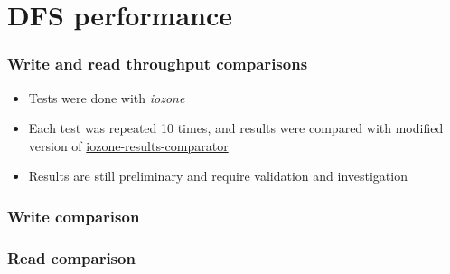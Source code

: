 \documentclass[handout]{beamer}
\begin{document}
\section{DFS performance}
\begin{frame}
\frametitle{Write and read throughput comparisons}
\begin{itemize}
\item Tests were done with \emph{iozone}
\item Each test was repeated 10 times, and results were compared with modified version of \href{https://code.google.com/p/iozone-results-comparator/}{iozone-results-comparator}
\item Results are still preliminary and require validation and investigation
\end{itemize}
\end{frame}
\begin{frame}
\frametitle{Write comparison}
\end{frame}


\begin{frame}
\frametitle{Read comparison}
\end{frame}
\end{document}
